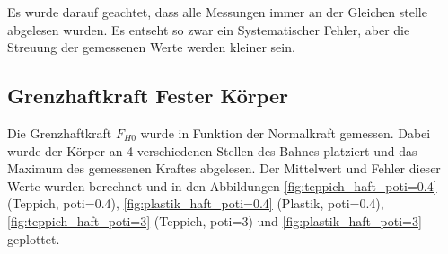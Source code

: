 Es wurde darauf geachtet, dass  alle  Messungen  immer  an  der  Gleichen stelle
abgelesen  wurden.  Es  entseht  so zwar ein  Systematischer  Fehler,  aber  die
Streuung der gemessenen Werte werden kleiner sein.


\subsection{Grenzhaftkraft Fester K\"orper}

Die Grenzhaftkraft $F_{H0}$ wurde  in  Funktion  der Normalkraft gemessen. Dabei
wurde  der  K\"orper  an  4 verschiedenen Stellen des Bahnes platziert  und  das
Maximum des gemessenen Kraftes abgelesen. Der Mittelwert und Fehler dieser Werte
wurden  berechnet  und  in   den   Abbildungen   \ref{fig:teppich_haft_poti=0.4}
(Teppich,   poti=0.4),  \ref{fig:plastik_haft_poti=0.4}   (Plastik,   poti=0.4),
\ref{fig:teppich_haft_poti=3}           (Teppich,          poti=3)           und
\ref{fig:plastik_haft_poti=3} geplottet.

